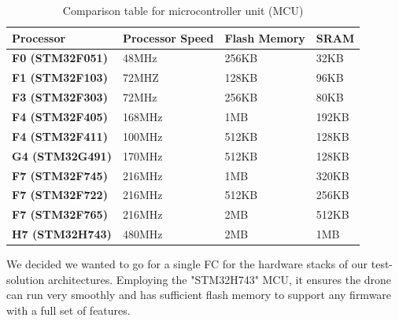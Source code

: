 \begin{table}
\begin{tabular}{ | >{\raggedright}p{} |
                   >{\raggedleft}p{} |
                   >{\raggedleft}p{} |
                   >{\raggedleft\arraybackslash}p{} | } \hline

\bfseries{Processor}        & \centering\bfseries{Processor Speed}    & \centering\bfseries{Flash Memory}   & \centering\arraybackslash\bfseries{SRAM} \\\hline
\bfseries{F0 (STM32F051)}   & 48MHz                         & 256KB                     & 32KB  \\\hline
\bfseries{F1 (STM32F103)}   & 72MHZ                         & 128KB                     & 96KB  \\\hline
\bfseries{F3 (STM32F303)}   & 72MHz                         & 256KB                     & 80KB  \\\hline
\bfseries{F4 (STM32F405)}   & 168MHz                        & 1MB                       & 192KB \\\hline
\bfseries{F4 (STM32F411)}   & 100MHz                        & 512KB                     & 128KB \\\hline
\bfseries{G4 (STM32G491)}   & 170MHz                        & 512KB                     & 128KB \\\hline
\bfseries{F7 (STM32F745)}   & 216MHz                        & 1MB                       & 320KB \\\hline
\bfseries{F7 (STM32F722)}   & 216MHz                        & 512KB                     & 256KB \\\hline
\bfseries{F7 (STM32F765)}   & 216MHz                        & 2MB                       & 512KB \\\hline
\bfseries{H7 (STM32H743)}   & 480MHz                        & 2MB                       & 1MB   \\\hline

\end{tabular}
\caption{Comparison table for microcontroller unit (MCU) \protect\cite{comparison-FC}}
\end{table}

We decided we wanted to go for a single FC for the hardware stacks of our test-solution architectures. Employing the "STM32H743" MCU, it ensures the drone can run very smoothly and has sufficient flash memory to support any firmware with a full set of features.

